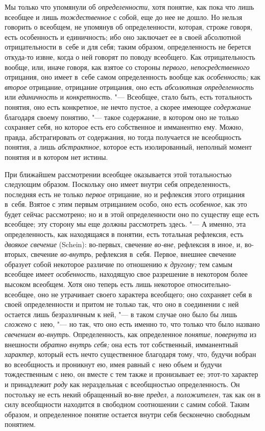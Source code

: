 Мы только что упомянули об {\em определенности}, хотя понятие, как пока что
лишь всеобщее и лишь {\em тождественное} с
собой, еще до нее не дошло. Но нельзя говорить о всеобщем, не упомянув об
определенности, которая, строже говоря, есть особенность и единичность; ибо
оно заключает ее в своей абсолютной отрицательности в~себе и для себя;
таким образом, определенность не берется откуда-то извне, когда о ней
говорят по поводу всеобщего. Как отрицательность вообще, или, иначе говоря,
как взятое со стороны {\em первого, непосредственного} отрицания, оно
имеет в~себе самом определенность вообще как {\em особенность;} как
{\em второе} отрицание, отрицание отрицания, оно есть {\em абсолютная
определенность} или {\em единичность} и {\em конкретность}. "--- Всеобщее,
стало быть, есть тотальность понятия, оно есть
конкретное, не нечто пустое, а скорее имеющее {\em содержание}
благодаря своему понятию, "--- такое содержание,
в котором оно не только сохраняет себя, но которое есть его собственное и
имманентно ему. Можно, правда, абстрагировать от содержания, но тогда
получается не всеобщность понятия, а лишь {\em абстрактное},
которое есть изолированный, неполный момент понятия и в котором нет истины.

При ближайшем рассмотрении всеобщее оказывается этой
тотальностью следующим образом. Поскольку оно имеет внутри себя
определенность, последняя есть не только {\em первое} отрицание,
но и рефлексия этого отрицания в~себя. Взятое с этим первым отрицанием
особо, оно есть {\em особенное},
как это будет сейчас рассмотрено; но и в этой определенности
оно по существу еще есть всеобщее; эту сторону мы еще должны рассмотреть
здесь. "--- \label{bkm:bm23a}А именно, эта определенность, как
находящаяся в понятии, есть тотальная рефлексия, есть {\em двоякое свечение}
(Schein): во-первых, свечение {\em во-вне}, рефлексия в иное, и, во-вторых,
свечение {\em во-внутрь}, рефлексия в~себя. Первое, внешнее свечение образует
собой некоторое различие по отношению {\em к другому;} тем самым всеобщее имеет
{\em особенность}, находящую свое разрешение в некотором более высоком
всеобщем. Хотя оно теперь есть лишь некоторое относительно-всеобщее, оно не
утрачивает своего характера всеобщего; оно сохраняет себя в своей
определенности и притом не только так, что оно в соединении с ней остается
лишь безразличным к ней, "--- в таком случае оно было бы лишь {\em сложено}
с~нею, "--- но так, что оно есть именно то, что только что было названо
{\em свечением во-внутрь}. Определенность, как определенное {\em понятие},
{\em повернута} из внешности {\em обратно внутрь себя;} она есть тот
собственный, имманентный {\em характер}, который есть нечто существенное
благодаря тому, что, будучи вобран во всеобщность и проникнут ею, имея равный
с~нею объем и будучи тождественным с нею, он вместе с тем также и пронизывает
ее; этот-то характер и принадлежит {\em роду} как нераздельная с всеобщностью
определенность. Он постольку не есть некий обращенный во-вне {\em предел},
а {\em положителен}, так как он в силу всеобщности находится в свободном
соотношении с самим собой. Таким образом, и определенное понятие остается
внутри себя бесконечно свободным понятием.

